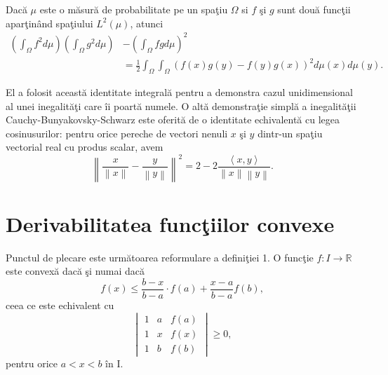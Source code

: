 \documentclass[a4paper,12pt,oneside]{report}
\begin{document}
Dac\u{a} \(\mu\) este o m\u{a}sur\u{a} de probabilitate pe un spa\c{t}iu \(\Omega\) si \(f\) \c{s}i \(g\) sunt dou\u{a} func\c{t}ii apar\c{t}in\^{a}nd spa\c{t}iului \(L^{2}\left ( \mu  \right )\), atunci
\begin{displaymath}
\begin{split}
  \left (\int_{\Omega}f^{2}d\mu \right )\left (\int_{\Omega}g^{2}d\mu \right ) &- \left (\int_{\Omega}fgd\mu \right )^{2}\\
   &= \frac{1}{2}\int_{\Omega}\int_{\Omega}\left ( f\left ( x \right )g\left ( y \right ) - f\left ( y \right )g\left ( x \right )\right )^{2}d\mu \left ( x \right )d\mu \left ( y \right ).
  \end{split}
\end{displaymath}

  El a folosit aceast\u{a} identitate integral\u{a} pentru a demonstra cazul unidimensional al unei inegalit\u{a}\c{t}i care \^{i}i poart\u{a} numele. O alt\u{a} demonstra\c{t}ie simpl\u{a} a inegalit\u{a}\c{t}ii Cauchy-Bunyakovsky-Schwarz este oferit\u{a}  de o identitate echivalent\u{a} cu legea cosinusurilor: pentru orice pereche de vectori nenuli \(x\) \c{s}i \(y\) dintr-un spa\c{t}iu vectorial real cu produs scalar, avem
\begin{displaymath}
  \left \| \frac{x}{\left \| x \right \|} - \frac{y}{\left \| y \right \|}\right \|^{2} = 2 - 2\frac{\left \langle x , y \right \rangle}{\left \| x \right \|\left \| y \right \|}.
\end{displaymath}

\section{Derivabilitatea func\c{t}iilor convexe}

Punctul de plecare este urm\u{a}toarea reformulare a defini\c{t}iei 1. O func\c{t}ie \(f : I \rightarrow \mathbb{R}\) este convex\u{a} dac\u{a} \c{s}i numai dac\u{a}
\begin{displaymath}
   f\left ( x \right ) \leq \frac{b - x}{b - a} \cdot f\left ( a \right ) + \frac{x- a}{b - a}f\left ( b \right ), \label{eq:1.10} \tag{1.10}
\end{displaymath}
ceea ce este echivalent cu
\begin{displaymath}
   \begin{vmatrix}
1 &  a& f\left ( a \right )\\
 1&  x& f\left ( x \right )\\
 1&  b& f\left ( b \right )
\end{vmatrix} \geq 0,
\label{eq:1.11} \tag{1.11}
\end{displaymath}
pentru orice \(a< x< b\) \^{i}n I.
\end{document}
